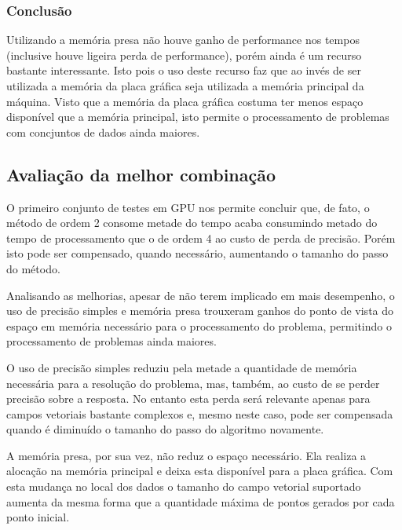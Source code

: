     \subsubsection{Conclusão}
    Utilizando a memória presa não houve ganho de performance nos tempos (inclusive houve ligeira perda de performance), porém ainda é um recurso bastante interessante. Isto pois o uso deste recurso faz que ao invés de ser utilizada a memória da placa gráfica seja utilizada a memória principal da máquina. Visto que a memória da placa gráfica costuma ter menos espaço disponível que a memória principal, isto permite o processamento de problemas com concjuntos de dados ainda maiores.
  
  
  \subsection{Avaliação da melhor combinação}
  O primeiro conjunto de testes em GPU nos permite concluir que, de fato, o método de ordem 2 consome metade do tempo acaba consumindo metado do tempo de processamento que o de ordem 4 ao custo de perda de precisão. Porém isto pode ser compensado, quando necessário, aumentando o tamanho do passo do método.
  
  Analisando as melhorias, apesar de  não terem implicado em mais desempenho, o uso de precisão simples e memória presa trouxeram ganhos do ponto de vista do espaço em memória necessário para o processamento do problema, permitindo o processamento de problemas ainda maiores.
  
  O uso de precisão simples reduziu pela metade a quantidade de memória necessária para a resolução do problema, mas, também, ao custo de se perder precisão sobre a resposta. No entanto esta perda será relevante apenas para campos vetoriais bastante complexos e, mesmo neste caso, pode ser compensada quando é diminuído o tamanho do passo do algoritmo novamente.
  
  A memória presa, por sua vez, não reduz o espaço necessário. Ela realiza a alocação na memória principal e deixa esta disponível para a placa gráfica. Com esta mudança no local dos dados o tamanho do campo vetorial suportado aumenta da mesma forma que a quantidade máxima de pontos gerados por cada ponto inicial.
